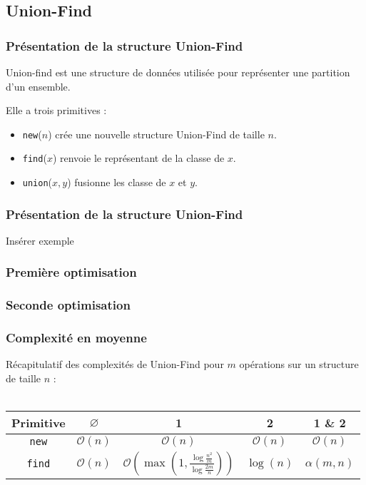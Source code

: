 \documentclass{beamer}
\begin{document}
		\subsection{Union-Find}
			\begin{frame}
				\frametitle{Présentation de la structure Union-Find}
				
				Union-find est une structure de données utilisée pour
				représenter une partition d'un ensemble.
				
				Elle a trois primitives :
				\begin{itemize}
					\item \texttt{new}($n$) crée une nouvelle structure
						Union-Find de taille $n$.
					\item \texttt{find}($x$) renvoie le représentant de
						la classe de $x$.
					\item \texttt{union}($x,y$) fusionne les classe de
						$x$ et $y$.
				\end{itemize}
			\end{frame}
			\begin{frame}
				\frametitle{Présentation de la structure Union-Find}

				Insérer exemple
			\end{frame}
			\begin{frame}
				\frametitle{Première optimisation}
					
				
			\end{frame}
			\begin{frame}
				\frametitle{Seconde optimisation}

			\end{frame}
			\begin{frame}
				\frametitle{Complexité en moyenne}

				Récapitulatif des complexités de Union-Find pour $m$
				opérations sur un structure de taille $n$ :
				\\~\\
				\begin{tabular}{|c|c|c|c|c|}
					\hline
					Primitive & $\varnothing$ & 1 & 2 & 1 \& 2
					\\
					\hline
					\texttt{new} & $\mathcal{O}(n)$ & $\mathcal{O}(n)$
					& $\mathcal{O}(n)$ & $\mathcal{O}(n)$
					\\
					\hline
					\texttt{find} & $\mathcal{O}(n)$ &
					$\mathcal{O}(\max(1,\frac
						{\log\frac{n^{2}}{m}}
						{\log\frac{2m}{n}}))$ &
					$\log(n)$ & $\alpha(m,n)$ 
					\\
					\hline
				\end{tabular}

			\end{frame}
\end{document}
